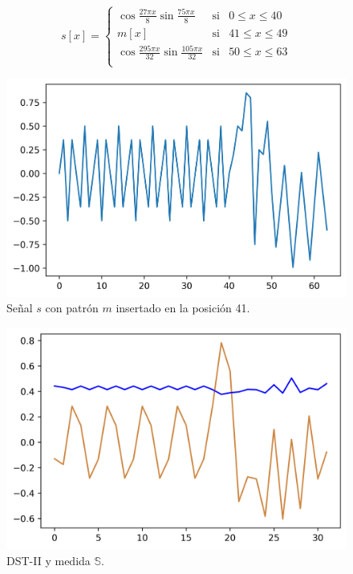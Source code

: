 \begin{equation}
	s[x] = \left\{ \begin{array}{rcl}
			\cos{\frac{27\pi x}{8}}\sin{\frac{75\pi x}{8}} & \mbox{si} &  0\leq x \leq 40 \\
			m[x]    &    \mbox{si}     &     41\leq x \leq 49     \\
			\cos{\frac{295\pi x}{32}}\sin{\frac{105\pi x}{32}} & \mbox{si} &  50\leq x \leq 63 \\
					 \end{array}
	\right.
\end{equation}

\begin{figure}
	\centering
	\includegraphics[scale=0.8]{Graphics/example-guido-signal.png}
	\caption{Señal $s$ con patrón $m$ insertado en la posición 41.} \label{fig:example-guido-signal}
\end{figure}

\begin{figure}
	\centering
	\includegraphics[scale=0.8]{Graphics/example-guido-signal-dst-s-wrong-matching.png}
	\caption{DST-II y medida $\mathbb{S}$.} \label{fig:example-guido-signal-dst-s-wrong-matching}
\end{figure}



